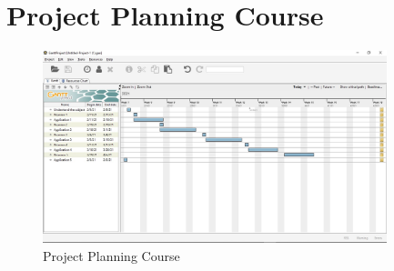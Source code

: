 \documentclass{article}
\begin{document}
\section{Project Planning Course}
\begin{figure}[ht!]
\centering
\includegraphics[width=100mm]{GG.jpg}
\caption{Project Planning Course \label{overflow}}
\end{figure}
\end{document}
